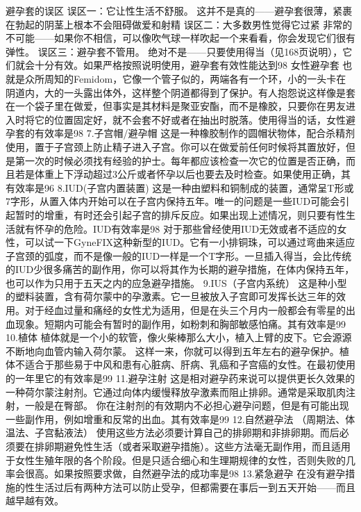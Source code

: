 \documentclass[12pt,UTF8]{ctexbook}
\begin{document}
避孕套的误区
误区一：它让性生活不舒服。
这并不是真的——避孕套很薄，紧裹在勃起的阴茎上根本不会阻碍做爱和射精
误区二：大多数男性觉得它过紧
非常的不可能——如果你不相信，可以像吹气球一样吹起一个来看看，你会发现它们很有弹性。
误区三：避孕套不管用。
绝对不是——只要使用得当（见168页说明），它们就会十分有效。如果严格按照说明使用，避孕套有效性能达到98%
女性避孕套
也就是众所周知的Femidom，它像一个管子似的，两端各有一个环，小的一头卡在阴道内，大的一头露出体外，这样整个阴道都得到了保护。有人抱怨说这样像是套在一个袋子里在做爱，但事实是其材料是聚亚安酯，而不是橡胶，只要你在男友进入时将它的位置固定好，就不会套不好或者在抽出时脱落。使用得当的话，女性避孕套的有效率是98%
7.子宫帽/避孕帽
这是一种橡胶制作的圆帽状物体，配合杀精剂使用，置于子宫颈上防止精子进入子宫。你可以在做爱前任何时候将其置放好，但是第一次的时候必须找有经验的护士。每年都应该检查一次它的位置是否正确，而且若是体重上下浮动超过3公斤或者怀孕以后也要去及时检查。如果使用正确，其有效率是96%
8.IUD(子宫内置装置)
这是一种由塑料和铜制成的装置，通常呈T形或7字形，从置入体内开始可以在子宫内保持五年。唯一的问题是一些IUD可能会引起暂时的增重，有时还会引起子宫的排斥反应。如果出现上述情况，则只要有性生活就有怀孕的危险。IUD有效率是98%
对于那些曾经使用IUD无效或者不适应的女性，可以试一下GyneFIX这种新型的IUD。它有一小排铜珠，可以通过弯曲来适应子宫颈的弧度，而不是像一般的IUD一样是一个T字形。一旦插入得当，会比传统的IUD少很多痛苦的副作用，你可以将其作为长期的避孕措施，在体内保持五年，也可以作为只用于五天之内的应急避孕措施。
9.IUS（子宫内系统）
这是种小型的塑料装置，含有荷尔蒙中的孕激素。它一旦被放入子宫即可发挥长达三年的效用。对于经血过量和痛经的女性尤为适用，但是在头三个月内一般都会有零星的出血现象。短期内可能会有暂时的副作用，如粉刺和胸部敏感怕痛。其有效率是99%
10.植体
植体就是一个小的软管，像火柴棒那么大小，植入上臂的皮下。它会源源不断地向血管内输入荷尔蒙。
这样一来，你就可以得到五年左右的避孕保护。植体不适合于那些易于中风和患有心脏病、肝病、乳癌和子宫癌的女性。在最初使用的一年里它的有效率是99%
11.避孕注射
这是相对避孕药来说可以提供更长久效果的一种荷尔蒙注射剂。它通过向体内缓慢释放孕激素而阻止排卵。通常是采取肌肉注射，一般是在臀部。
你在注射剂的有效期内不必担心避孕问题，但是有可能出现一些副作用，例如增重和反常的出血。其有效率是99%
12.自然避孕法
（周期法、体温法、子宫黏液法）
使用这些方法必须要计算自己的排卵期和非排卵期。而后必须要在排卵期避免性生活（或者采取避孕措施）。这些方法毫无副作用，而且适用于女性生殖年限的各个阶段。但是只适合细心和生理期规律的女性，否则失败的几率会很高。如果按照要求做，自然避孕法的成功率是98%
13.紧急避孕
在没有避孕措施的性生活过后有两种方法可以防止受孕，但都需要在事后一到五天开始——而且越早越有效。
\end{document}
